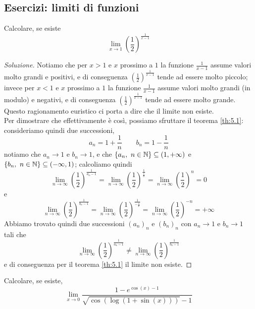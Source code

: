 \subsection{Esercizi: limiti di funzioni}
\begin{exercise}
    \label{ex:5.1}
    Calcolare, se esiste
    \[
    \lim_{x\to 1} \left(\frac{1}{2}\right)^{\frac{1}{x-1}}
    \]
\end{exercise}
\begin{proof}[Soluzione]
    Notiamo che per $x>1$ e $x$ prossimo a $1$ la funzione $\frac{1}{x-1}$ assume valori molto grandi e positivi, e di conseguenza $\left(\frac{1}{2}\right)^{\frac{1}{x-1}}$ tende ad essere molto piccolo; invece per $x<1$ e $x$ prossimo a $1$ la funzione $\frac{1}{x-1}$ assume valori molto grandi (in modulo) e negativi, e di conseguenza $\left(\frac{1}{2}\right)^{\frac{1}{x-1}}$ tende ad essere molto grande. Questo ragionamento euristico ci porta a dire che il limite non esiste. \\
    Per dimostrare che effettivamente è così, possiamo sfruttare il teorema \ref{th:5.1}: consideriamo quindi due successioni,
    \[
    a_n = 1+\frac{1}{n} \qquad b_n = 1-\frac{1}{n}
    \]
    notiamo che $a_n \to 1$ e $b_n \to 1$, e che $\{a_n, \ n\in\amsbb{N}\}\subseteq (1,+\infty)$ e $\{b_n, \ n\in\amsbb{N}\}\subseteq (-\infty, 1)$; calcoliamo quindi
    \[
    \lim_{n\to\infty} \left(\frac{1}{2}\right)^{\frac{1}{a_n-1}} = \lim_{n\to\infty} \left(\frac{1}{2}\right)^{\frac{1}{\frac{1}{n}}} = \lim_{n\to\infty}\left(\frac{1}{2}\right)^n = 0
    \]
    e 
    \[
    \lim_{n\to\infty} \left(\frac{1}{2}\right)^{\frac{1}{b_n-1}} = \lim_{n\to\infty} \left(\frac{1}{2}\right)^{\frac{1}{-\frac{1}{n}}} = \lim_{n\to\infty}\left(\frac{1}{2}\right)^{-n} = +\infty
    \]
    Abbiamo trovato quindi due successioni $(a_n)_n$ e $(b_n)_n$ con $a_n\to 1$ e $b_n\to 1$ tali che
    \[
    \lim_{n\to\infty}\left(\frac{1}{2}\right)^{\frac{1}{a_n-1}} \ne 
    \lim_{n\to\infty}\left(\frac{1}{2}\right)^{\frac{1}{b_n-1}}
    \]
    e di conseguenza per il teorema \ref{th:5.1} il limite non esiste.
\end{proof}
\begin{exercise}
    \label{ex:5.0}
    Calcolare, se esiste,
    \[
    \lim_{x\to 0} \frac{1-e^{\cos(x)-1}}{\sqrt{\cos(\log(1+\sin(x)))}-1}
    \]
\end{exercise}
